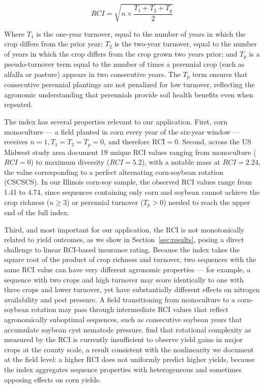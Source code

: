 \documentclass[12pt,letterpaper]{article}
\theoremstyle{remark}
\theoremstyle{plain}
\theoremstyle{definition}
\begin{document}
\begin{equation}
    RCI = \sqrt{n\times \dfrac{T_{1}+T_{2}+T_{p}}{2}}
\end{equation}

Where $T_{1}$ is the one-year turnover, equal to the number of years in which the crop differs from the prior year; $T_{2}$ is the two-year turnover, equal to the number of years in which the crop differs from the crop grown two years prior; and $T_{p}$ is a pseudo-turnover term equal to the number of times a perennial crop (such as alfalfa or pasture) appears in two consecutive years. The $T_{p}$ term ensures that consecutive perennial plantings are not penalized for low turnover, reflecting the agronomic understanding that perennials provide soil health benefits even when repeated. 

The index has several properties relevant to our application. First, corn monoculture — a field planted in corn every year of the six-year window — receives $n=1, T_{1}=T_{2}=T_{p}=0$, and therefore $\text{RCI} = 0$. Second, across the US Midwest study area \cite{socolar2021} document 19 unique RCI values ranging from monoculture ($RCI = 0$) to maximum diversity ($RCI = 5.2$), with a notable mass at $RCI = 2.24$, the value corresponding to a perfect alternating corn-soybean rotation (CSCSCS). In our Illinois corn-soy sample, the observed RCI values range from 1.41 to 4.74, since sequences containing only corn and soybean cannot achieve the crop richness ($n \geq 3$) or perennial turnover ($T_{p} > 0$) needed to reach the upper end of the full index.

Third, and most important for our application, the RCI is not monotonically related to yield outcomes, as we show in Section~\ref{sec:results}, posing a direct challenge to linear RCI-based insurance rating. Because the index takes the square root of the product of crop richness and turnover, two sequences with the same RCI value can have very different agronomic properties — for example, a sequence with two crops and high turnover may score identically to one with three crops and lower turnover, yet have substantially different effects on nitrogen availability and pest pressure. A field transitioning from monoculture to a corn-soybean rotation may pass through intermediate RCI values that reflect agronomically suboptimal sequences, such as consecutive soybean years that accumulate soybean cyst nematode pressure. \cite{burchfield2024} find that rotational complexity as measured by the RCI is currently insufficient to observe yield gains in major crops at the county scale, a result consistent with the nonlinearity we document at the field level: a higher RCI does not uniformly predict higher yields, because the index aggregates sequence properties with heterogeneous and sometimes opposing effects on corn yields.
\end{document}
